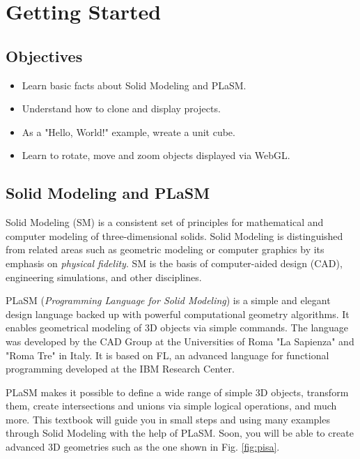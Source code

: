 \documentclass{article}
\begin{document}
\newpage
\setcounter{tocdepth}{2}
\tableofcontents

\newpage

\pagestyle{plain}
\setcounter{page}{1}


\newpage

\pagestyle{plain}
\setcounter{page}{1}

\section{Getting Started}

\subsection{Objectives}
\begin{itemize}
\item Learn basic facts about Solid Modeling and PLaSM.
\item Understand how to clone and display projects.
\item As a "Hello, World!" example, wreate a unit cube.
\item Learn to rotate, move and zoom objects displayed via WebGL.
\end{itemize}

\subsection{Solid Modeling and PLaSM}

Solid Modeling (SM) is a consistent set of principles for mathematical and computer 
modeling of three-dimensional solids. Solid Modeling is distinguished from related 
areas such as geometric modeling or computer graphics by its emphasis on {\em physical fidelity}.
SM is the basis of computer-aided design (CAD), engineering simulations, and other disciplines.

PLaSM ({\em Programming Language for Solid Modeling}) is a simple and elegant design 
language backed up with powerful computational geometry algorithms. It 
enables geometrical modeling of 3D objects via simple commands.
The language was developed by the CAD Group at the Universities of Roma 
"La Sapienza" and "Roma Tre" in Italy. It is based on FL, an advanced 
language for functional programming developed at the IBM Research Center.

PLaSM makes it possible to define a wide range of simple 3D objects, transform 
them, create intersections and unions via simple logical operations, and much 
more. This textbook will guide you in small steps and using many examples
through Solid Modeling with the help of PLaSM. Soon, you will be able to create 
advanced 3D geometries such as the one shown in Fig. \ref{fig:pisa}.
\end{document}
